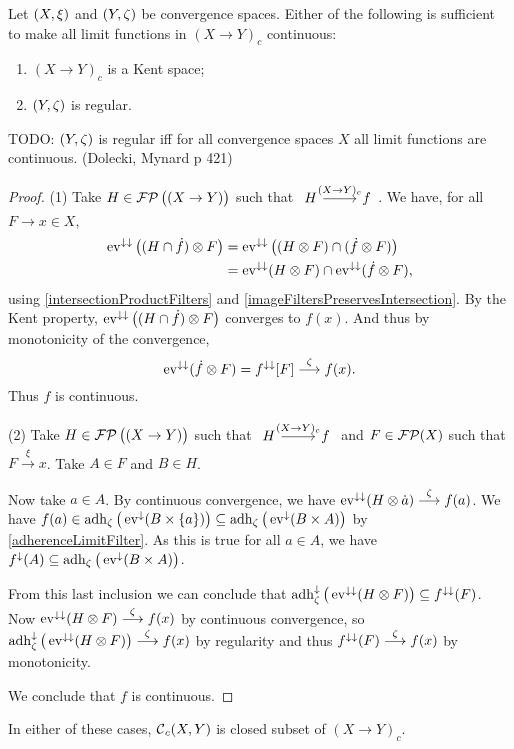 \begin{proposition} \label{continuousLimitsContinuous}
Let $\left( X,\xi \right)$ and $\left( Y,\zeta \right)$ be convergence spaces. Either of the following is sufficient to make all limit functions in $(X\to Y)_c$ continuous:
\begin{enumerate}
\item $(X\to Y)_c$ is a Kent space;
\item $\left( Y,\zeta \right)$ is regular. 
\end{enumerate}
\end{proposition}
TODO: $\left( Y,\zeta \right)$ is regular iff for all convergence spaces $X$ all limit functions are continuous. (Dolecki, Mynard p 421)
\begin{proof}
(1) Take $H\in\operatorname{\mathcal{FP}}\big((X\to Y)\big)$ such that $\begin{tikzcd}H \arrow[r, "{(X\to Y)_c}"] & f\end{tikzcd}$. We have, for all $F\to x\in X$,
\begin{align*}
\operatorname{ev}^{\downarrow\downarrow}\big((H\cap \dot{f})\otimes F\big) &= \operatorname{ev}^{\downarrow\downarrow}\big((H \otimes F) \cap (\dot{f} \otimes F)\big) \\
&= \operatorname{ev}^{\downarrow\downarrow}(H \otimes F) \cap \operatorname{ev}^{\downarrow\downarrow}(\dot{f} \otimes F),
\end{align*} 
using \ref{intersectionProductFilters} and \ref{imageFiltersPreservesIntersection}. By the Kent property, $\operatorname{ev}^{\downarrow\downarrow}\big((H\cap \dot{f})\otimes F\big)$ converges to $f(x)$. And thus by monotonicity of the convergence,
\[ \operatorname{ev}^{\downarrow\downarrow}(\dot{f} \otimes F) = f^{\downarrow\downarrow}[F] \overset{\zeta}{\longrightarrow} f(x). \]
Thus $f$ is continuous.

(2) Take $H\in\operatorname{\mathcal{FP}}\big((X\to Y)\big)$ such that $\begin{tikzcd}H \arrow[r, "{(X\to Y)_c}"] & f\end{tikzcd}$ and $F\in\operatorname{\mathcal{FP}}(X)$ such that $F\overset{\xi}{\longrightarrow} x$. Take $A\in F$ and $B\in H$.

Now take $a\in A$. By continuous convergence, we have $\operatorname{ev}^{\downarrow\downarrow}(H\otimes\dot{a}) \overset{\zeta}{\longrightarrow} f(a)$. We have $f(a)\in\operatorname{adh}_\zeta\big(\operatorname{ev}^\downarrow(B\times\{a\})\big) \subseteq \operatorname{adh}_\zeta\big(\operatorname{ev}^\downarrow(B\times A)\big)$ by \ref{adherenceLimitFilter}. As this is true for all $a\in A$, we have $f^\downarrow(A) \subseteq \operatorname{adh}_\zeta\big(\operatorname{ev}^\downarrow(B\times A)\big)$.

From this last inclusion we can conclude that $\operatorname{adh}_\zeta^\downarrow\big(\operatorname{ev}^{\downarrow\downarrow}(H\otimes F)\big) \subseteq f^{\downarrow\downarrow}(F)$. Now $\operatorname{ev}^{\downarrow\downarrow}(H\otimes F)\overset{\zeta}{\longrightarrow} f(x)$ by continuous convergence, so $\operatorname{adh}_\zeta^\downarrow\big(\operatorname{ev}^{\downarrow\downarrow}(H\otimes F)\big)\overset{\zeta}{\longrightarrow} f(x)$ by regularity and thus $f^{\downarrow\downarrow}(F)\overset{\zeta}{\longrightarrow} f(x)$ by monotonicity.

We conclude that $f$ is continuous.
\end{proof}
\begin{corollary} \label{setOfContinuousFunctionsContinuouslyClosed}
In either of these cases, $\operatorname{\mathcal{C}}_c(X,Y)$ is closed subset of $(X\to Y)_c$.
\end{corollary}


